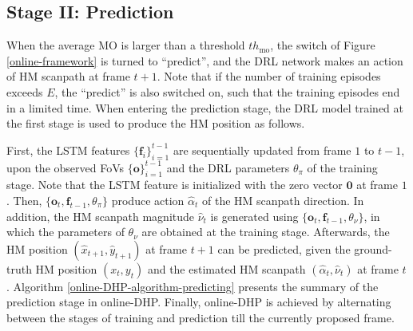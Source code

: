 \documentclass[10pt,journal,compsoc]{IEEEtran}
\begin{document}
\subsection{Stage II: Prediction}
When the average MO is larger than a threshold $th_{\text{mo}}$, the switch of Figure \ref{online-framework} is turned to ``predict'', and the DRL network makes an action of HM scanpath at frame $t+1$.
Note that if the number of training episodes exceeds $E$, the ``predict'' is also switched on, such that the training episodes end in a limited time.
When entering the prediction stage, the DRL model trained at the first stage is used to produce the HM position as follows.

First, the LSTM features $\{\mathbf{f}_i\}_{i=1}^{t-1}$ are sequentially updated from frame $1$ to $t-1$, upon the observed FoVs $\{\mathbf{o}\}_{i=1}^{t-1}$ and the DRL parameters $\theta_{\pi}$ of the training stage. Note that the LSTM feature is initialized with the zero vector $\mathbf{0}$ at frame $1$. Then, $\{\mathbf{o}_t, \mathbf{f}_{t-1}, \theta_{\pi}\}$ produce action $\hat{\alpha}_t$ of the HM scanpath direction. In addition, the HM scanpath magnitude $\hat{\nu}_t$ is generated using $\{\mathbf{o}_t, \mathbf{f}_{t-1}, \theta_{\nu}\}$, in which the parameters of $\theta_{\nu}$ are obtained at the training stage. Afterwards, the HM position $(\hat{x}_{t+1}, \hat{y}_{t+1})$ at frame $t+1$ can be predicted, given the ground-truth HM position $(\!x_{t}, \!y_{t}\!)$ and the estimated HM scanpath $(\hat{\alpha}_t, \hat{\nu}_t)$ at frame $t$. Algorithm \ref{online-DHP-algorithm-predicting} presents the summary of the prediction stage in online-DHP. Finally, online-DHP is achieved by alternating between the stages of training and prediction till the currently proposed frame.

%
%
%
%
\end{document}
